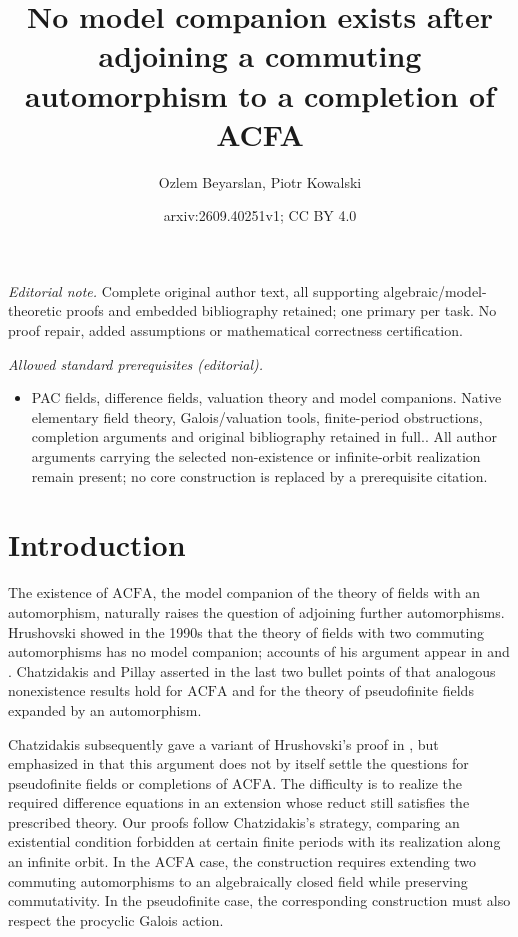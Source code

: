\documentclass[10pt,a4paper]{amsart}
\title{No model companion exists after adjoining a commuting automorphism to a completion of ACFA}
\author{Ozlem Beyarslan, Piotr Kowalski}
\date{arxiv:2609.40251v1; CC BY 4.0}
\theoremstyle{definition}
\newcommand{\ACFA}{\mathrm{ACFA}}
\begin{document}
\maketitle
\noindent\textit{Editorial note.} Complete original author text, all supporting algebraic/model-theoretic proofs and embedded bibliography retained; one primary per task. No proof repair, added assumptions or mathematical correctness certification.\par\medskip
\noindent\textit{Allowed standard prerequisites (editorial).}\begin{itemize}
\item PAC fields, difference fields, valuation theory and model companions. Native elementary field theory, Galois/valuation tools, finite-period obstructions, completion arguments and original bibliography retained in full.. All author arguments carrying the selected non-existence or infinite-orbit realization remain present; no core construction is replaced by a prerequisite citation.
\end{itemize}\medskip
\section{Introduction}\label{sec:introduction}

The existence of $\ACFA$, the model companion of the theory of
fields with an automorphism, naturally raises the question of
adjoining further automorphisms. Hrushovski showed in the 1990s that the theory of fields
with two commuting automorphisms has no model companion;
accounts of his argument appear in
\cite[Section~3]{KikyoSurvey} and
\cite[Section~1.11]{Survey}. 
Chatzidakis and Pillay asserted in the last two bullet points
of \cite[Section~3.11]{CP} that analogous nonexistence results
hold for $\ACFA$ and for the theory of pseudofinite fields
expanded by an automorphism.

Chatzidakis subsequently gave a variant of Hrushovski's proof
in \cite[Section~1.11]{Survey}, but emphasized in
\cite[Remark~1.12]{Survey} that this argument does not by itself
settle the questions for pseudofinite fields or completions of
$\ACFA$. The difficulty is to realize the required difference
equations in an extension whose reduct still satisfies the
prescribed theory. Our proofs follow Chatzidakis's strategy, comparing an
existential condition forbidden at certain finite periods with
its realization along an infinite orbit.
 In the $\ACFA$ case, the construction requires
extending two commuting automorphisms to an algebraically closed
field while preserving commutativity. In the pseudofinite case,
the corresponding construction must also respect the procyclic
Galois action.
\end{document}
